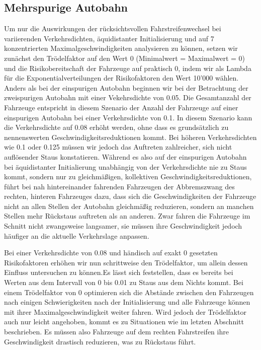 \documentclass[10pt, a4paper]{article}
\begin{document}
\subsection{Mehrspurige Autobahn}
\label{subsec:mehrspurig}

Um nur die Auswirkungen der rücksichtsvollen Fahrstreifenwechsel bei variierenden Verkehrsdichten, äquidistanter Initialisierung und auf 7 konzentrierten Maximalgeschwindigkeiten analysieren zu können, setzen wir zunächst den Trödelfaktor auf den Wert 0 (Minimalwert = Maximalwert = 0) und die Risikobereitschaft der Fahrzeuge auf praktisch 0, indem wir als Lambda für die Exponentialverteilungen der Risikofaktoren den Wert 10'000 wählen.
Anders als bei der einspurigen Autobahn beginnen wir bei der Betrachtung der zweispurigen Autobahn mit einer Vekehrsdichte von 0.05. Die Gesamtanzahl der Fahrzeuge entspricht in diesem Szenario der Anzahl der Fahrzeuge auf einer einspurigen Autobahn bei einer Verkehrsdichte von 0.1.
In diesem Szenario kann die Verkehrsdichte auf 0.08 erhöht werden, ohne dass es grundsätzlich zu nennenswerten Geschwindigkeitsreduktionen kommt. Bei höheren Verkehrsdichten wie 0.1 oder 0.125 müssen wir jedoch das Auftreten zahlreicher, sich nicht auflösender Staus konstatieren.
Während es also auf der einspurigen Autobahn bei äquidistanter Initialierung unabhängig von der Verkehrsdichte nie zu Staus kommt, sondern nur zu gleichmäßigen, kollektiven Geschwindigkeitsreduktionen, führt bei nah hintereinander fahrenden Fahrzeugen der Abbremszwang des rechten, hinteren Fahrzeuges dazu, dass sich die Geschwindigkeiten der Fahrzeuge nicht an allen Stellen der Autobahn gleichmäßig reduzieren, sondern an manchen Stellen mehr Rückstaus auftreten als an anderen. Zwar fahren die Fahrzeuge im Schnitt nicht zwangsweise langsamer, sie müssen ihre Geschwindigkeit jedoch häufiger an die aktuelle Verkehrslage anpassen.

Bei einer Verkehrsdichte von 0.08 und händisch auf exakt 0 gesetzten Risikofaktoren erhöhen wir nun schrittweise den Trödelfaktor, um allein dessen Einfluss untersuchen zu können.Es lässt sich feststellen, dass es bereits bei Werten aus dem Intervall von 0 bis 0.01 zu Staus aus dem Nichts kommt. Bei einem Trödelfaktor von 0 optimieren sich die Abstände zwischen den Fahrzeugen nach einigen Schwierigkeiten nach der Initialisierung und alle Fahrzeuge können mit ihrer Maximalgeschwindigkeit weiter fahren. Wird jedoch der Trödelfaktor auch nur leicht angehoben, kommt es zu Situationen wie im letzten Abschnitt beschrieben. Es müssen also Fahrzeuge auf dem rechten Fahrstreifen ihre Geschwindigkeit drastisch reduzieren, was zu Rückstaus führt.
\end{document}
